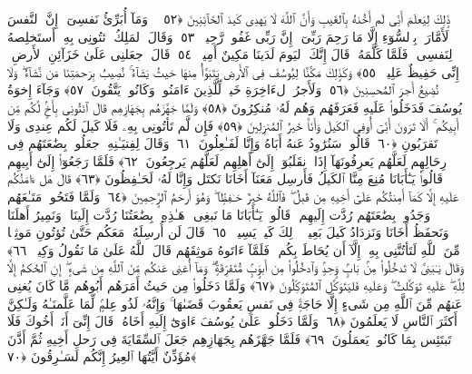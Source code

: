  ذَٟلِكَ لِيَعلَمَ أَنِّى لَم أَخُنهُ بِٱلغَيبِ وَأَنَّ ٱللَّهَ لَا يَهدِى كَيدَ ٱلخَآئِنِينَ ﴿٥٢﴾
 ۞ وَمَآ أُبَرِّئُ نَفسِىٓ ۚ إِنَّ ٱلنَّفسَ لَأَمَّارَةٌۢ بِٱلسُّوٓءِ إِلَّا مَا رَحِمَ رَبِّىٓ ۚ إِنَّ رَبِّى غَفُورٌۭ رَّحِيمٌۭ ﴿٥٣﴾
 وَقَالَ ٱلمَلِكُ ٱئتُونِى بِهِۦٓ أَستَخلِصهُ لِنَفسِى ۖ فَلَمَّا كَلَّمَهُۥ قَالَ إِنَّكَ ٱليَومَ لَدَينَا مَكِينٌ أَمِينٌۭ ﴿٥٤﴾
 قَالَ ٱجعَلنِى عَلَىٰ خَزَآئِنِ ٱلأَرضِ ۖ إِنِّى حَفِيظٌ عَلِيمٌۭ ﴿٥٥﴾
 وَكَذَٟلِكَ مَكَّنَّا لِيُوسُفَ فِى ٱلأَرضِ يَتَبَوَّأُ مِنهَا حَيثُ يَشَآءُ ۚ نُصِيبُ بِرَحمَتِنَا مَن نَّشَآءُ ۖ وَلَا نُضِيعُ أَجرَ ٱلمُحسِنِينَ ﴿٥٦﴾
 وَلَأَجرُ ٱلءَاخِرَةِ خَيرٌۭ لِّلَّذِينَ ءَامَنُوا۟ وَكَانُوا۟ يَتَّقُونَ ﴿٥٧﴾
 وَجَآءَ إِخوَةُ يُوسُفَ فَدَخَلُوا۟ عَلَيهِ فَعَرَفَهُم وَهُم لَهُۥ مُنكِرُونَ ﴿٥٨﴾
 وَلَمَّا جَهَّزَهُم بِجَهَازِهِم قَالَ ٱئتُونِى بِأَخٍۢ لَّكُم مِّن أَبِيكُم ۚ أَلَا تَرَونَ أَنِّىٓ أُوفِى ٱلكَيلَ وَأَنَا۠ خَيرُ ٱلمُنزِلِينَ ﴿٥٩﴾
 فَإِن لَّم تَأتُونِى بِهِۦ فَلَا كَيلَ لَكُم عِندِى وَلَا تَقرَبُونِ ﴿٦٠﴾
 قَالُوا۟ سَنُرَٰوِدُ عَنهُ أَبَاهُ وَإِنَّا لَفَـٰعِلُونَ ﴿٦١﴾
 وَقَالَ لِفِتيَـٰنِهِ ٱجعَلُوا۟ بِضَٰعَتَهُم فِى رِحَالِهِم لَعَلَّهُم يَعرِفُونَهَآ إِذَا ٱنقَلَبُوٓا۟ إِلَىٰٓ أَهلِهِم لَعَلَّهُم يَرجِعُونَ ﴿٦٢﴾
 فَلَمَّا رَجَعُوٓا۟ إِلَىٰٓ أَبِيهِم قَالُوا۟ يَـٰٓأَبَانَا مُنِعَ مِنَّا ٱلكَيلُ فَأَرسِل مَعَنَآ أَخَانَا نَكتَل وَإِنَّا لَهُۥ لَحَـٰفِظُونَ ﴿٦٣﴾
 قَالَ هَل ءَامَنُكُم عَلَيهِ إِلَّا كَمَآ أَمِنتُكُم عَلَىٰٓ أَخِيهِ مِن قَبلُ ۖ فَٱللَّهُ خَيرٌ حَـٰفِظًۭا ۖ وَهُوَ أَرحَمُ ٱلرَّٟحِمِينَ ﴿٦٤﴾
 وَلَمَّا فَتَحُوا۟ مَتَـٰعَهُم وَجَدُوا۟ بِضَٰعَتَهُم رُدَّت إِلَيهِم ۖ قَالُوا۟ يَـٰٓأَبَانَا مَا نَبغِى ۖ هَـٰذِهِۦ بِضَٰعَتُنَا رُدَّت إِلَينَا ۖ وَنَمِيرُ أَهلَنَا وَنَحفَظُ أَخَانَا وَنَزدَادُ كَيلَ بَعِيرٍۢ ۖ ذَٟلِكَ كَيلٌۭ يَسِيرٌۭ ﴿٦٥﴾
 قَالَ لَن أُرسِلَهُۥ مَعَكُم حَتَّىٰ تُؤتُونِ مَوثِقًۭا مِّنَ ٱللَّهِ لَتَأتُنَّنِى بِهِۦٓ إِلَّآ أَن يُحَاطَ بِكُم ۖ فَلَمَّآ ءَاتَوهُ مَوثِقَهُم قَالَ ٱللَّهُ عَلَىٰ مَا نَقُولُ وَكِيلٌۭ ﴿٦٦﴾
 وَقَالَ يَـٰبَنِىَّ لَا تَدخُلُوا۟ مِنۢ بَابٍۢ وَٟحِدٍۢ وَٱدخُلُوا۟ مِن أَبوَٟبٍۢ مُّتَفَرِّقَةٍۢ ۖ وَمَآ أُغنِى عَنكُم مِّنَ ٱللَّهِ مِن شَىءٍ ۖ إِنِ ٱلحُكمُ إِلَّا لِلَّهِ ۖ عَلَيهِ تَوَكَّلتُ ۖ وَعَلَيهِ فَليَتَوَكَّلِ ٱلمُتَوَكِّلُونَ ﴿٦٧﴾
 وَلَمَّا دَخَلُوا۟ مِن حَيثُ أَمَرَهُم أَبُوهُم مَّا كَانَ يُغنِى عَنهُم مِّنَ ٱللَّهِ مِن شَىءٍ إِلَّا حَاجَةًۭ فِى نَفسِ يَعقُوبَ قَضَىٰهَا ۚ وَإِنَّهُۥ لَذُو عِلمٍۢ لِّمَا عَلَّمنَـٰهُ وَلَـٰكِنَّ أَكثَرَ ٱلنَّاسِ لَا يَعلَمُونَ ﴿٦٨﴾
 وَلَمَّا دَخَلُوا۟ عَلَىٰ يُوسُفَ ءَاوَىٰٓ إِلَيهِ أَخَاهُ ۖ قَالَ إِنِّىٓ أَنَا۠ أَخُوكَ فَلَا تَبتَئِس بِمَا كَانُوا۟ يَعمَلُونَ ﴿٦٩﴾
 فَلَمَّا جَهَّزَهُم بِجَهَازِهِم جَعَلَ ٱلسِّقَايَةَ فِى رَحلِ أَخِيهِ ثُمَّ أَذَّنَ مُؤَذِّنٌ أَيَّتُهَا ٱلعِيرُ إِنَّكُم لَسَـٰرِقُونَ ﴿٧٠﴾
